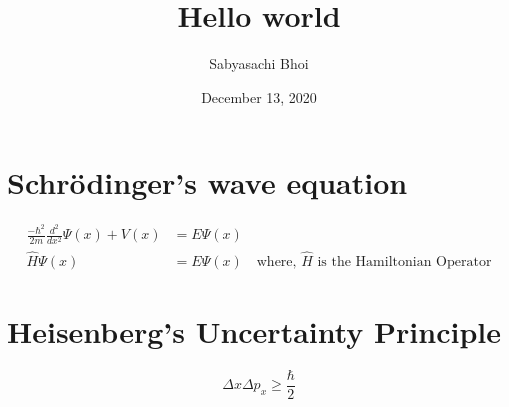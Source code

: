 \documentclass[12pt]{article}
\begin{document}
\title{Hello world}
\author{ Sabyasachi Bhoi }
\date{December 13, 2020}
\maketitle

\section{Schr\"odinger's wave equation}

\begin{align*}
	\frac{-\hbar^2}{2m} \frac{d^2}{dx^2} \Psi(x) + V(x) &= E\Psi(x)\\
	\hat{H}\Psi(x) &= E\Psi(x) \quad \textrm{where, $\hat{H}$ is the Hamiltonian Operator}
\end{align*}

\section{Heisenberg's Uncertainty Principle}
\begin{equation}
	\Delta x \Delta p_x \geq \frac{\hbar}{2} 
\end{equation}
\end{document}
